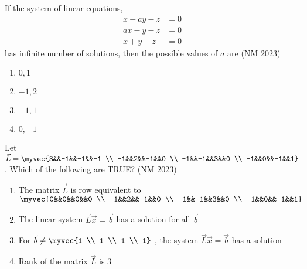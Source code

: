 \item If the system of linear equations, 
	\begin{align*}
	x-ay-z&=0\\ ax-y-z&=0\\ x+y-z&=0
\end{align*}
	has infinite number of solutions, then the possible values of $a$ are 
	\hfill (NM 2023)
\begin{multicols}{4}
\begin{enumerate}
     \item $0,1$
     \item $-1,2$
     \item $-1,1$
     \item $0,-1$
\end{enumerate}
\end{multicols}
\item Let $\vec{L}=\myvec{3&&-1&&-1&&-1 \\ -1&&2&&-1&&0 \\ -1&&-1&&3&&0 \\ -1&&0&&-1&&1}$. Which of the following are TRUE?
	\hfill (NM 2023)
\begin{enumerate}
    \item The matrix $\vec{L}$ is row equivalent to $\myvec{0&&0&&0&&0 \\ -1&&2&&-1&&0 \\ -1&&-1&&3&&0 \\ -1&&0&&-1&&1} $
    \item  The linear system $\vec{L}\vec{x}=\vec{b}$ has a solution for all $\vec{b}$
    \item For $\vec{b} \neq \myvec{1 \\ 1 \\ 1 \\ 1}$ ,  the system $\vec{L}\vec{x}=\vec{b}$ has a solution 
    \item Rank of the matrix $\vec{L}$ is 3 
\end{enumerate}
